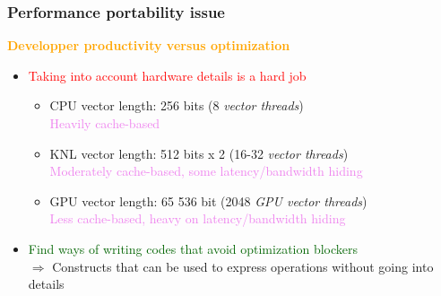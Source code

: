 \begin{frame}
  \frametitle{Performance portability issue}
  \textcolor{orange}{\large \textbf{Developper productivity versus optimization}}

  \begin{itemize}
  \item \textcolor{red}{Taking into account hardware details is a hard job}
    \begin{itemize}
    \item CPU vector length: 256 bits (8 \textit{vector threads})\\
      \textcolor{violet}{Heavily cache-based}
    \item KNL vector length: 512 bits  x  2 (16-32 \textit{vector threads})\\
      \textcolor{violet}{Moderately cache-based, some latency/bandwidth hiding}
    \item GPU vector length: 65 536 bit (2048 \textit{GPU vector threads})\\
      \textcolor{violet}{Less cache-based, heavy on latency/bandwidth hiding}
    \end{itemize}
  \item \textcolor{darkgreen}{Find ways of writing codes that avoid optimization blockers}\\
    $\Rightarrow$ Constructs that can be used to express operations without going into details
  \end{itemize}
\end{frame}

